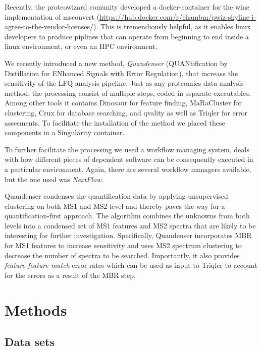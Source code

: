 \documentclass[11pt]{article}
\begin{document}
Recently, the proteowizard comunity developed a docker-container for the wine implementation of msconvert (\url{https://hub.docker.com/r/chambm/pwiz-skyline-i-agree-to-the-vendor-licenses/}). This is tremendiously helpful, as it enables linux developers to produce piplines that can operate from beginning to end inside a linux environment, or even an HPC environment.

We recently introduced a new method, {\em Quandenser} (QUANtification by
Distillation for ENhanced Signals with Error Regulation), that increase the sensitivity of the LFQ
analysis pipeline. Just as any proteomics data analysis method, the processing consist of multiple steps, coded in separate executables. Among other tools it contains Dinosaur\cite{teleman2016dinosaur} for feature finding, MaRaCluster\cite{the2016maracluster} for clustering, Crux\cite{mcilwain2014} for database searching, and qvality\cite{kall2008non} as well as Triqler\cite{the2018integrated} for error assesments. To facilitate the installation of the method we placed these components in a Singularity container.

To further facilitate the processing we used a workflow managing system, deals with how different pieces of dependent software can be consequently executed in a particular environment. Again, there are several workflow managers available, but the one used was \textit{NextFlow}\cite{di2017nextflow}.

Quandenser condenses the quantification data by applying
unsupervised clustering on both MS1 and MS2 level and thereby paves the way for
a quantification-first approach. The algorithm combines the unknowns from both
levels into a condensed set of MS1 features and MS2 spectra that are likely to
be interesting for further investigation. Specifically, Quandenser incorporates
MBR for MS1 features to increase sensitivity and uses MS2 spectrum clustering
to decrease the number of spectra to be searched. Importantly, it also provides
{\em feature-feature match} error rates which can be used as input to Triqler
to account for the errors as a result of the MBR step.



\section*{Methods}

\subsection*{Data sets}
\end{document}
